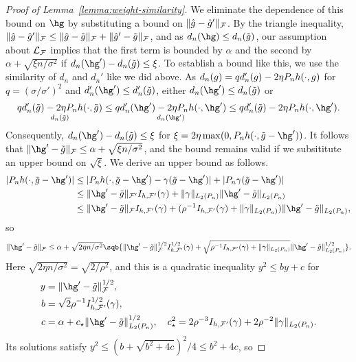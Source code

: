 \begin{proof}[Proof of Lemma~\ref{lemma:weight-similarity}]
We eliminate the dependence of this bound on $\hg$ by substituting a bound on $\lVert\hat g - \hat g'\rVert_{\mathcal{F}}$.
By the triangle inequality, $\lVert\hat g - \hat g'\rVert_{\mathcal{F}} \le \lVert\hat g - \tilde g\rVert_{\mathcal{F}} + \lVert\hat g' - \tilde g\rVert_{\mathcal{F}}$,
and as $d_n(\hg) \le d_n(\tilde g)$, our assumption about $\mathcal{L}_{\mathcal{F}}$
implies that the first term is bounded by $\alpha$ and the second by $\alpha + \sqrt{\xi n/\sigma^2}$ if $d_n(\hg') - d_n(\gapprox) \le \xi$.
To establish a bound like this, we use the similarity of
$d_n$ and $d_n'$ like we did above. As $d_n(g) = q d_n'(g) - 2\eta \Pn h(\cdot,g)$ for $q=(\sigma/\sigma')^2$
and $d_n'(\hg') \le d_n'(\gapprox)$, either $d_n(\hg') \le d_n(\gapprox)$ or
\[ \underset{d_n(\gapprox)}{ q d_n'(\gapprox) - 2\eta \Pn h(\cdot, \gapprox)}  \le
   \underset{d_n(\hg')}{q d_n'(\hg') - 2\eta \Pn h(\cdot,\hg')} \le    
   q d_n'(\gapprox) - 2\eta \Pn h(\cdot,\hg'). \]
Consequently, $d_n(\hg') - d_n(\gapprox) \le \xi$ for $\xi= 2\eta\max(0, \Pn h(\cdot, \gapprox - \hg'))$.
It follows that $\norm{\hg' - \tilde g}_{\F} \le \alpha + \sqrt{\xi n/\sigma^2}$,
and the bound remains valid if we subsititute an upper bound on $\sqrt{\xi}$.
We derive an upper bound as follows.
\begin{align*} 
\abs{\Pn h(\cdot, \gapprox - \hg')} 
&\le \abs{\Pn h(\cdot, \gapprox - \hg') - \gamma (\gapprox - \hg')} + \abs{\Pn \gamma (\gapprox - \hg')} \\
&\le \norm{\hg' - \gapprox}_{\F'} I_{h,\F'}(\gamma) + \norm{\gamma}_{L_2(\Pn)} \norm{\hg'- \gapprox}_{L_2(\Pn)} \\
&\le \norm{\hg' - \gapprox}_{\F} I_{h,\F'}(\gamma) + (\rho^{-1}I_{h,\F'}(\gamma) + \norm{\gamma}_{L_2(\Pn)}) \norm{\hg'- \gapprox}_{L_2(\Pn)},
\end{align*}
so 
\[ \norm{\hg' - \tilde g}_{\F} \le \alpha 
+ \sqrt{2\eta n/\sigma^2}\sqb{\norm{\hg' - \gapprox}_{\F}^{1/2} I_{h,\F'}^{1/2}(\gamma) 
	   + \sqrt{\rho^{-1}I_{h,\F'}(\gamma) + \norm{\gamma}_{L_2(\Pn)}} \norm{\hg'- \gapprox}_{L_2(\Pn)}^{1/2}}.
\]
Here $\sqrt{2\eta n/\sigma^2} = \sqrt{2/\rho^2}$, and this 
is a quadratic inequality $y^2 \le  by + c$ for 
\begin{align*} 
y&=\norm{\hg' - \tilde g}_{\F}^{1/2},\\
b&=\sqrt{2} \rho^{-1} I_{h,\F'}^{1/2}(\gamma),\\
c&= \alpha + c_{\star}\norm{\hg'- \gapprox}_{L_2(\Pn)}^{1/2}, 
\quad  c_{\star}^2 = 2\rho^{-3}I_{h,\F'}(\gamma) + 2\rho^{-2} \norm{\gamma}_{L_2(\Pn)}. 
\end{align*}
Its solutions satisfy $y^2 \le (b + \sqrt{b^2+4c})^2/4 \le b^2 + 4c$, so

\end{proof}
